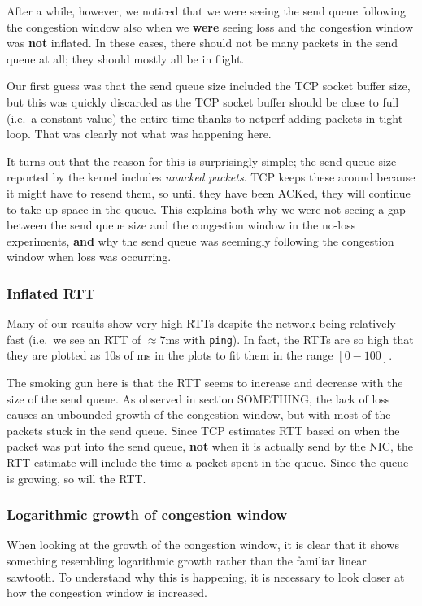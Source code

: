 \documentclass[12pt,a4paper]{article}
\begin{document}
After a while, however, we noticed that we were seeing the send queue following
the congestion window also when we \textbf{were} seeing loss and the congestion
window was \textbf{not} inflated. In these cases, there should not be many
packets in the send queue at all; they should mostly all be in flight.

Our first guess was that the send queue size included the TCP socket buffer
size, but this was quickly discarded as the TCP socket buffer should be close to
full (i.e.\ a constant value) the entire time thanks to netperf adding packets
in tight loop. That was clearly not what was happening here.

It turns out that the reason for this is surprisingly simple; the send queue
size reported by the kernel includes \textit{unacked packets}. TCP keeps these
around because it might have to resend them, so until they have been ACKed, they
will continue to take up space in the queue. This explains both why we were not
seeing a gap between the send queue size and the congestion window in the
no-loss experiments, \textbf{and} why the send queue was seemingly following the
congestion window when loss was occurring.

\subsubsection{Inflated RTT}
Many of our results show very high RTTs despite the network being relatively
fast (i.e.\ we see an RTT of $\approx 7$ms with \texttt{ping}). In fact, the
RTTs are so high that they are plotted as 10s of ms in the plots to fit them in
the range $[0-100]$.

The smoking gun here is that the RTT seems to increase and decrease with the
size of the send queue. As observed in section SOMETHING, the lack of loss     %
causes an unbounded growth of the congestion window, but with most of the
packets stuck in the send queue. Since TCP estimates RTT based on when the
packet was put into the send queue, \textbf{not} when it is actually send by the
NIC, the RTT estimate will include the time a packet spent in the queue. Since
the queue is growing, so will the RTT.

\subsubsection{Logarithmic growth of congestion window}
When looking at the growth of the congestion window, it is clear that it shows
something resembling logarithmic growth rather than the familiar linear
sawtooth. To understand why this is happening, it is necessary to look closer at
how the congestion window is increased.
\end{document}
